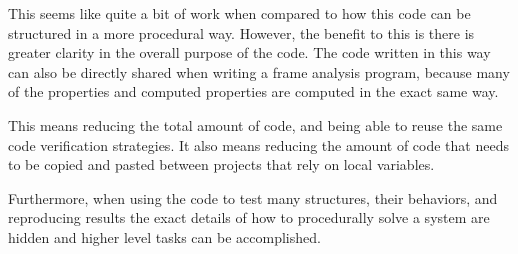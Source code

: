 This seems like quite a bit of work when compared to how this code can be structured in a more procedural way.
However, the benefit to this is there is greater clarity in the overall purpose of the code.
The code written in this way can also be directly shared when writing a frame analysis program, because many of the properties and computed properties are computed in the exact same way.

This means reducing the total amount of code, and being able to reuse the same code verification strategies. It also means reducing the amount of code that needs to be copied and pasted between projects that rely on local variables.

Furthermore, when using the code to test many structures, their behaviors, and reproducing results the exact details of how to procedurally solve a system are hidden and higher level tasks can be accomplished.

